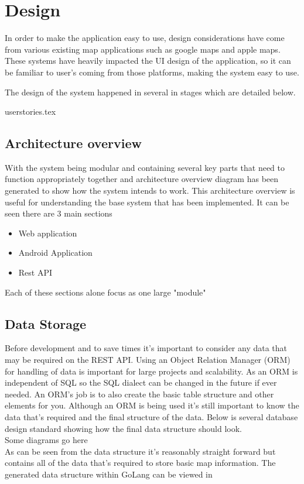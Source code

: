 \section{Design}
In order to make the application easy to use, design considerations have come from various existing map applications such as google maps and apple maps. These systems have heavily impacted the UI design of the application, so it can be familiar to user's coming from those platforms, making the system easy to use.

The design of the system happened in several in stages which are detailed below.

{userstories.tex}

\subsection{Architecture overview}
With the system being modular and containing several key parts that need to function appropriately together and architecture overview diagram has been generated to show how the system intends to work. This architecture overview is useful for understanding the base system that has been implemented. It can be seen there are 3 main sections

\begin{itemize}
	\item Web application
	\item Android Application
	\item Rest API
\end{itemize}

Each of these sections alone focus as one large "module" 

\subsection{Data Storage}
Before development and to save times it's important to consider any data that may be required on the REST API. Using an Object Relation Manager (ORM) for handling of data is important for large projects and scalability. As an ORM is independent of SQL so the SQL dialect can be changed in the future if ever needed. An ORM's job is to also create the basic table structure and other elements for you. Although an ORM is being used it's still important to know the data that's required and the final structure of the data. Below is several database design standard showing how the final data structure should look.
\\
Some diagrams go here
\\
As can be seen from the data structure it's reasonably straight forward but contains all of the data that's required to store basic map information. The generated data structure within GoLang can be viewed in \appendixtemp

